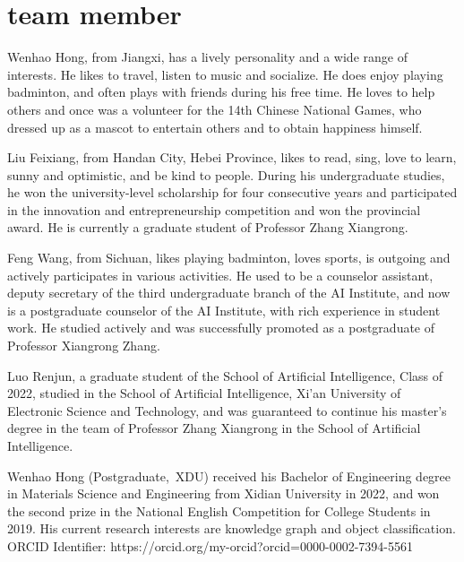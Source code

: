\documentclass[journal]{IEEEtran}
\begin{document}
\section{team member}

Wenhao Hong, from Jiangxi, has a lively personality and a wide range of interests. He likes to travel, listen to music and socialize. He does enjoy playing badminton, and often plays with friends during his free time. He loves to help others and once was a volunteer for the 14th Chinese National Games, who dressed up as a mascot to entertain others and to obtain happiness himself.

Liu Feixiang, from Handan City, Hebei Province, likes to read, sing, love to learn, sunny and optimistic, and be kind to people. During his undergraduate studies, he won the university-level scholarship for four consecutive years and participated in the innovation and entrepreneurship competition and won the provincial award. He is currently a graduate student of Professor Zhang Xiangrong.

Feng Wang, from Sichuan, likes playing badminton, loves sports, is outgoing and actively participates in various activities. He used to be a counselor assistant, deputy secretary of the third undergraduate branch of the AI Institute, and now is a postgraduate counselor of the AI Institute, with rich experience in student work. He studied actively and was successfully promoted as a postgraduate of Professor Xiangrong Zhang. 

Luo Renjun, a graduate student of the School of Artificial Intelligence, Class of 2022, studied in the School of Artificial Intelligence, Xi'an University of Electronic Science and Technology, and was guaranteed to continue his master's degree in the team of Professor Zhang Xiangrong in the School of Artificial Intelligence.





\begin{IEEEbiography}{Wenhao Hong}
(Postgraduate,~XDU) received his Bachelor of Engineering degree in Materials Science and Engineering from Xidian University in 2022, and won the second prize in the National English Competition for College Students in 2019. His current research interests are knowledge graph and object classification. ORCID Identifier: https://orcid.org/my-orcid?orcid=0000-0002-7394-5561
\end{IEEEbiography}
\end{document}
